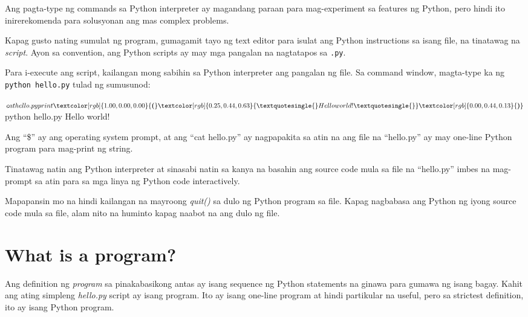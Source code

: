 \documentclass[10pt,]{book}
\newenvironment{Shaded}{}{}
\newcommand{\ErrorTok}[1]{\textcolor[rgb]{1.00,0.00,0.00}{\textbf{#1}}}
\newcommand{\ExtensionTok}[1]{#1}
\newcommand{\KeywordTok}[1]{\textcolor[rgb]{0.00,0.44,0.13}{\textbf{#1}}}
\newcommand{\NormalTok}[1]{#1}
\newcommand{\StringTok}[1]{\textcolor[rgb]{0.25,0.44,0.63}{#1}}
\begin{document}
Ang pagta-type ng commands sa Python interpreter ay magandang paraan
para mag-experiment sa features ng Python, pero hindi ito inirerekomenda
para solusyonan ang mas complex problems.

Kapag gusto nating sumulat ng program, gumagamit tayo ng text editor
para isulat ang Python instructions sa isang file, na tinatawag na
\emph{script}. Ayon sa convention, ang Python scripts ay may mga
pangalan na nagtatapos sa \texttt{.py}.


Para i-execute ang script, kailangan mong sabihin sa Python interpreter
ang pangalan ng file. Sa command window, magta-type ka ng
\texttt{python\ hello.py} tulad ng sumusunod:

\begin{Shaded}
\begin{Highlighting}[]
\ExtensionTok{$}\NormalTok{ cat hello.py}
\ExtensionTok{print}\ErrorTok{(}\StringTok{\textquotesingle{}Hello world!\textquotesingle{}}\KeywordTok{)}
\ExtensionTok{$}\NormalTok{ python hello.py}
\ExtensionTok{Hello}\NormalTok{ world!}
\end{Highlighting}
\end{Shaded}

Ang ``\$'' ay ang operating system prompt, at ang ``cat hello.py'' ay
nagpapakita sa atin na ang file na ``hello.py'' ay may one-line Python
program para mag-print ng string.

Tinatawag natin ang Python interpreter at sinasabi natin sa kanya na
basahin ang source code mula sa file na ``hello.py'' imbes na mag-prompt
sa atin para sa mga linya ng Python code interactively.

Mapapansin mo na hindi kailangan na mayroong \emph{quit()} sa dulo ng
Python program sa file. Kapag nagbabasa ang Python ng iyong source code
mula sa file, alam nito na huminto kapag naabot na ang dulo ng file.

\section{What is a program?}\label{what-is-a-program}

Ang definition ng \emph{program} sa pinakabasikong antas ay isang
sequence ng Python statements na ginawa para gumawa ng isang bagay.
Kahit ang ating simpleng \emph{hello.py} script ay isang program. Ito ay
isang one-line program at hindi partikular na useful, pero sa strictest
definition, ito ay isang Python program.
\end{document}
